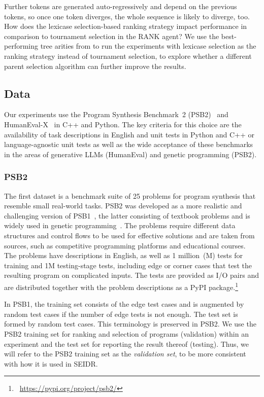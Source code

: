 Further tokens are generated auto-regressively and depend on the previous tokens, so once one token diverges, the whole sequence is likely to diverge, too. 
How does the lexicase selection-based ranking strategy impact performance in comparison to tournament selection in the RANK agent? 
We use the best-performing tree arities from \rqmultirun{} to run the experiments with lexicase selection as the ranking strategy instead of tournament selection, to explore whether a different parent selection algorithm can further improve the results.


\subsection{Data}
\label{sec:seidr-data}

Our experiments use the Program Synthesis Benchmark~2 (PSB2)~\cite{helmuth2022:applying} and HumanEval-X~\cite{zheng2023:codegeex} in C++ and Python. 
The key criteria for this choice are the availability of task descriptions in English and unit tests in Python and C++ or language-agnostic unit tests as well as the wide acceptance of these benchmarks in the areas of generative LLMs (HumanEval) and genetic programming (PSB2). 

\subsubsection{PSB2}
The first dataset is a benchmark suite of 25 problems for program synthesis that resemble small real-world tasks. PSB2 was developed as a more realistic and challenging version of PSB1~\cite{helmuth2015:general}, the latter consisting of textbook problems and is widely used in genetic programming~\cite{sobania2022:choose}. 
The problems require different data structures and control flows to be used for effective solutions and are taken from sources, such as competitive programming platforms and educational courses. 
The problems have descriptions in English, as well as 1 million~(M) tests for training and 1M testing-stage tests, including edge or corner cases that test the resulting program on complicated inputs. 
The tests are provided as I/O pairs and are distributed together with the problem descriptions as a PyPI package.\footnote{~\url{https://pypi.org/project/psb2/}} 

In PSB1, the training set consists of the edge test cases and is augmented by random test cases if the number of edge tests is not enough. The test set is formed by random test cases. 
This terminology is preserved in PSB2.
We use the PSB2 training set for ranking and selection of programs (validation) within an experiment and the test set for reporting the result thereof (testing).
Thus, we will refer to the PSB2 training set as the \emph{validation set}, to be more consistent with how it is used in SEIDR.

